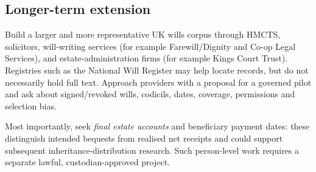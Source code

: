 \subsection{Longer-term extension}
Build a larger and more representative UK wills corpus through HMCTS, solicitors, will-writing services (for example Farewill/Dignity and Co-op Legal Services), and estate-administration firms (for example Kings Court Trust). Registries such as the National Will Register may help locate records, but do not necessarily hold full text. Approach providers with a proposal for a governed pilot and ask about signed/revoked wills, codicils, dates, coverage, permissions and selection bias.

Most importantly, seek \emph{final estate accounts} and beneficiary payment dates: these distinguish intended bequests from realised net receipts and could support subsequent inheritance-distribution research. Such person-level work requires a separate lawful, custodian-approved project.
